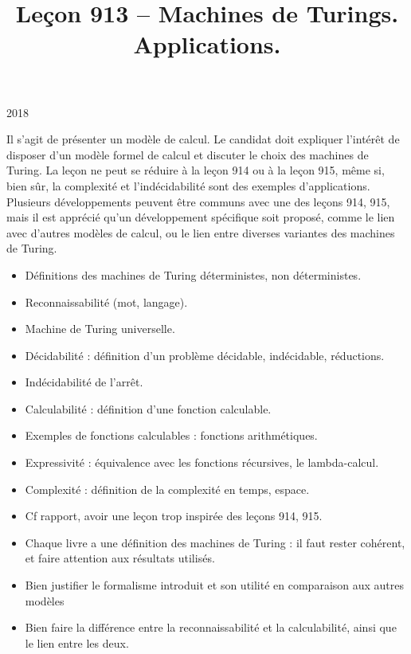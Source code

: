 \documentclass{agregfiche}
\title{Leçon 913 -- Machines de Turings. Applications.}
\begin{document}
\maketitle

\secrapports

\begin{rapport}{2018}

Il s'agit de présenter un modèle de calcul.
Le candidat doit expliquer l'intérêt de disposer d'un modèle formel de calcul et discuter le choix des machines de Turing.
La leçon ne peut se réduire à la leçon 914 ou à la leçon 915, même si, bien sûr, la complexité et l'indécidabilité sont des exemples d'applications.
Plusieurs développements peuvent être communs avec une des leçons 914, 915, mais il est apprécié qu'un développement spécifique soit proposé, comme le lien avec d'autres modèles de calcul, ou le lien entre diverses variantes des machines de Turing.

\end{rapport}

\secindispensables

\begin{itemize}
    \item Définitions des machines de Turing déterministes, non déterministes.
    \item Reconnaissabilité (mot, langage).
    \item Machine de Turing universelle.
    \item Décidabilité : définition d'un problème décidable, indécidable, réductions.
    \item Indécidabilité de l'arrêt.
    \item Calculabilité : définition d'une fonction calculable.
    \item Exemples de fonctions calculables : fonctions arithmétiques.
    \item Expressivité : équivalence avec les fonctions récursives, le lambda-calcul.
    \item Complexité : définition de la complexité en temps, espace.
\end{itemize}

\secpieges

\begin{itemize}
    \item Cf rapport, avoir une leçon trop inspirée des leçons 914, 915.
    \item Chaque livre a une définition des machines de Turing : il faut rester cohérent, et faire attention aux résultats utilisés.
    \item Bien justifier le formalisme introduit et son utilité en comparaison
        aux autres modèles
    \item Bien faire la différence entre la reconnaissabilité et la
        calculabilité, ainsi que le lien entre les deux.
\end{itemize}
\end{document}
